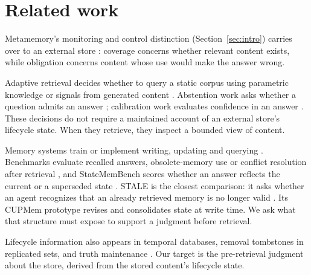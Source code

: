\documentclass{article}
\begin{document}
\section{Related work}\label{sec:related}
Metamemory's monitoring and control distinction (Section~\ref{sec:intro}) carries over to an external store \citep{koriat1996}: coverage concerns whether relevant content exists, while obligation concerns content whose use would make the answer wrong.

Adaptive retrieval decides whether to query a static corpus using parametric knowledge or signals from generated content \citep{lewis2020,flare,mallen2023,selfrag,su2024}. Abstention work asks whether a question admits an answer \citep{rajpurkar2018,kamath2020,yang2024,abstentionbench}; calibration work evaluates confidence in an answer \citep{kadavath2022,lin2022,tian2023,xiong2024}. These decisions do not require a maintained account of an external store's lifecycle state. When they retrieve, they inspect a bounded view of content.

Memory systems train or implement writing, updating and querying \citep{automem,supersede,packer2023,zhong2024,zhang2025survey,mem0,amem}. Benchmarks evaluate recalled answers, obsolete-memory use or conflict resolution after retrieval \citep{longmemeval,locomo,memora,memoryagentbench}, and StateMemBench scores whether an answer reflects the current or a superseded state \citep{statemembench}. STALE is the closest comparison: it asks whether an agent recognizes that an already retrieved memory is no longer valid \citep{stale}. Its CUPMem prototype revises and consolidates state at write time. We ask what that structure must expose to support a judgment before retrieval.

Lifecycle information also appears in temporal databases, removal tombstones in replicated sets, and truth maintenance \citep{snodgrass1986,shapiro2011,doyle1979,zep,nissenbaum2004,cimemories,maini2024,gatemem,pmbench,hushbench,xu2024conflicts,longpre2021,dhingra2022}. Our target is the pre-retrieval judgment about the store, derived from the stored content's lifecycle state.
\end{document}
